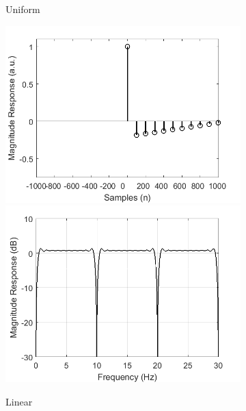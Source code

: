 \documentclass[a4paper]{article}
\begin{document}
\begin{figure}[hbtp]
\begin{subfigure}{.245\textwidth}
        \caption{Uniform}\label{fig:UniformKernel}
    \end{subfigure}
    \begin{subfigure}{.245\textwidth}
        \includegraphics[width=\textwidth]{img/causal/kernel_linear.png}\\
        \includegraphics[width=\textwidth]{img/causal/mag_linear.png}
        \caption{Linear}\label{fig:LinearKernel}
    \end{subfigure}
    \begin{subfigure}{.245\textwidth}

\end{subfigure}
\end{figure}
\end{document}
